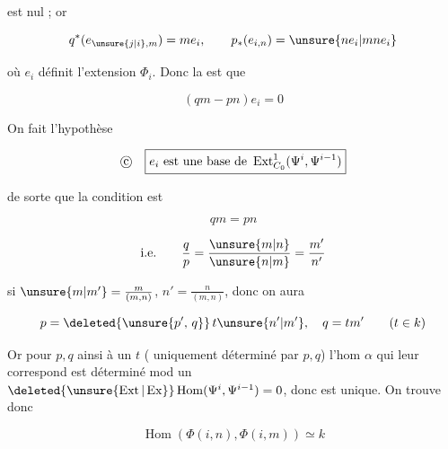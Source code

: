 
est nul ; or

\[q^*(e_{\unsure{j|i},m})=m e_i,\qquad p_*(e_{i,n})=\unsure{n e_i|mn e_i}\]

où $e_i$ définit l'extension $\Phi_i$. Donc la  est que

\[(qm-pn)e_i=0\]

On fait l'hypothèse

\[\text{\textcircled{c}}\quad\boxed{e_i\ \text{est une base de }\operatorname{Ext}^{1}_{C_0}(\Psi^i,\Psi^{i-1})}\]

de sorte que la condition  est

\[ qm=pn \]

\[ \text{i.e.}\qquad \frac qp=\frac{\unsure{m|n}}{\unsure{n|m}}=\frac{m'}{n'} \]

si $\unsure{m|m'}=\frac{m}{(m,n)}$, $n'=\frac{n}{(m,n)}$, donc on aura

\[p=\deleted{\unsure{p',\,q}}\,t\unsure{n'|m'},\quad q=tm'\qquad (t\in k)\]

Or pour $p,q$  ainsi à un $t$ ( uniquement déterminé par $p,q$) l'hom $\alpha$ qui leur correspond est déterminé mod un $\deleted{\unsure{\operatorname{Ext}|\operatorname{Ex}}}\operatorname{Hom}(\Psi^i,\Psi^{i-1})=0$, donc est unique. On trouve donc

\[ \operatorname{Hom}(\Phi(i,n),\Phi(i,m))\simeq k \]

